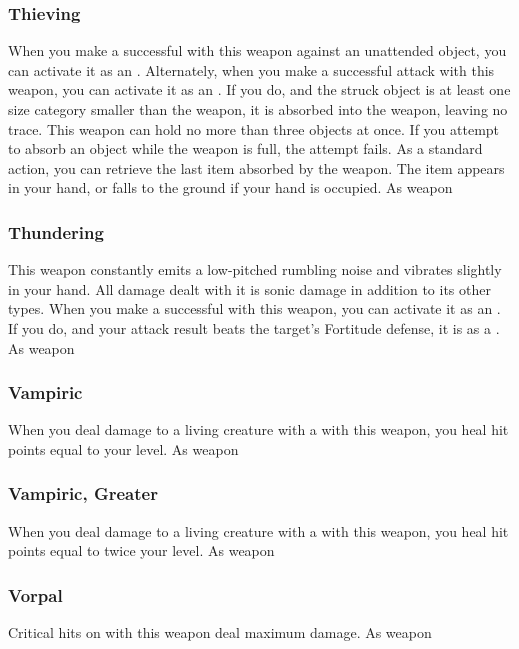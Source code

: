 \hypertarget{item:Thieving}{\subsubsection{Thieving\hfill{}}}
When you make a successful  with this weapon against an unattended object, you can activate it as an .
Alternately, when you make a successful  attack with this weapon, you can activate it as an .
If you do, and the struck object is at least one size category smaller than the weapon, it is absorbed into the weapon, leaving no trace.
This weapon can hold no more than three objects at once.
If you attempt to absorb an object while the weapon is full, the attempt fails.
As a standard action, you can retrieve the last item absorbed by the weapon.
The item appears in your hand, or falls to the ground if your hand is occupied.
 
 As weapon
\lowercase{\hypertarget{item:Thundering}{}}\label{item:Thundering}
\hypertarget{item:Thundering}{\subsubsection{Thundering\hfill{}}}
This weapon constantly emits a low-pitched rumbling noise and vibrates slightly in your hand.
All damage dealt with it is sonic damage in addition to its other types.
When you make a successful  with this weapon, you can activate it as an .
If you do, and your attack result beats the target's Fortitude defense, it is \deafened as a .
 
 As weapon
\lowercase{\hypertarget{item:Vampiric}{}}\label{item:Vampiric}
\hypertarget{item:Vampiric}{\subsubsection{Vampiric\hfill{}}}
When you deal damage to a living creature with a  with this weapon, you heal hit points equal to your level.
 
 As weapon
\lowercase{\hypertarget{item:Vampiric, Greater}{}}\label{item:Vampiric, Greater}
\hypertarget{item:Vampiric, Greater}{\subsubsection{Vampiric, Greater\hfill{}}}
When you deal damage to a living creature with a  with this weapon, you heal hit points equal to twice your level.
 
 As weapon
\lowercase{\hypertarget{item:Vorpal}{}}\label{item:Vorpal}
\hypertarget{item:Vorpal}{\subsubsection{Vorpal\hfill{}}}
Critical hits on  with this weapon deal maximum damage.
 
 As weapon